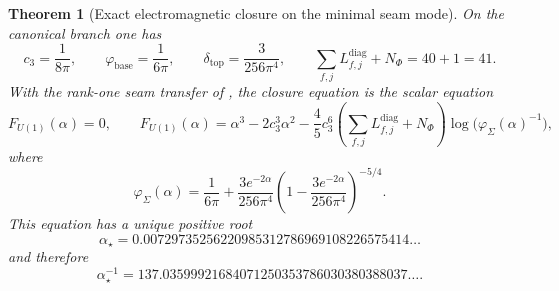 \documentclass[11pt,a4paper]{article}
\newtheorem{theorem}{Theorem}[section]
\theoremstyle{definition}
\theoremstyle{remark}
\newcommand{\cthree}{c_3}
\newcommand{\phibase}{\varphi_{\mathrm{base}}}
\newcommand{\phiseam}{\varphi_{\Sigma}}
\newcommand{\deltatop}{\delta_{\mathrm{top}}}
\begin{document}

\begin{theorem}[Exact electromagnetic closure on the minimal seam mode]
\label{thm:exact-electromagnetic-closure}
\label{thm:alpha-canonical}
On the canonical branch one has
\[
\cthree=\frac{1}{8\pi},
\qquad
\phibase=\frac{1}{6\pi},
\qquad
\deltatop=\frac{3}{256\pi^4},
\qquad
\sum_{f,j}L_{f,j}^{\mathrm{diag}}+N_\Phi=40+1=41.
\]
With the rank-one seam transfer of , the closure equation
is the scalar equation
\begin{equation}
\label{eq:carrier-cfe}
F_{U(1)}(\alpha)=0,
\qquad
F_{U(1)}(\alpha)=\alpha^3-2\cthree^3\alpha^2-\frac45\cthree^6
\left(\sum_{f,j}L_{f,j}^{\mathrm{diag}}+N_\Phi\right)\log\bigl(\phiseam(\alpha)^{-1}\bigr),
\end{equation}
where
\[
\phiseam(\alpha)=\frac{1}{6\pi}+\frac{3e^{-2\alpha}}{256\pi^4}
\left(1-\frac{3e^{-2\alpha}}{256\pi^4}\right)^{-5/4}.
\]
This equation has a unique positive root
\[
\alpha_{\star}=0.00729735256220985312786969108226575414\dots
\]
and therefore
\[
\alpha_{\star}^{-1}=137.03599921684071250353786030380388037\dots.
\]
\end{theorem}
\end{document}
